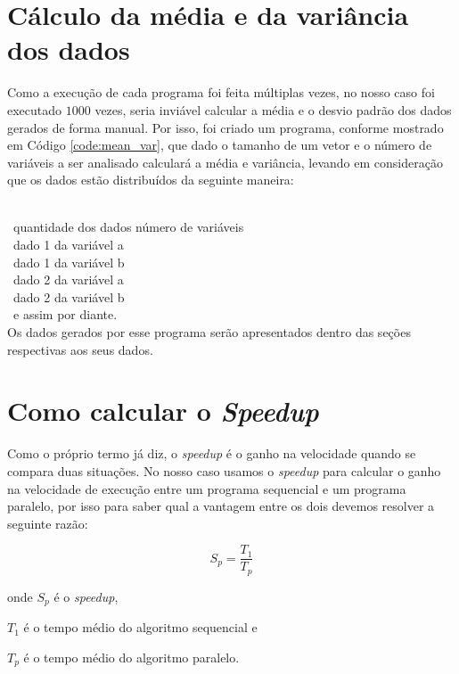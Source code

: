 \documentclass[11pt,twoside]{article}
\begin{document}
\section{Cálculo da média e da variância dos dados}
\label{sec:mean_var}

    Como a execução de cada programa foi feita múltiplas vezes, no nosso caso foi executado
    $1000$ vezes, seria inviável calcular a média e o desvio padrão dos dados gerados de forma
    manual. Por isso, foi criado um programa, conforme mostrado em Código \ref{code:mean_var},
    que dado o tamanho de um vetor e o número de variáveis a ser analisado calculará a média
    e variância, levando em consideração que os dados estão distribuídos da seguinte maneira:
    
    \ \\
    \ \indent quantidade dos dados \indent número de variáveis\\
    \ \indent dado 1 da variável a\\
    \ \indent dado 1 da variável b\\
    \ \indent dado 2 da variável a\\
    \ \indent dado 2 da variável b\\
    \ \indent e assim por diante.
    \ \\
    
    Os dados gerados por esse programa serão apresentados dentro das seções respectivas aos
    seus dados.

\section{Como calcular o {\it Speedup }}
\label{sec:speedup}

    Como o próprio termo já diz, o {\it speedup} é o ganho na velocidade quando se compara duas
    situações. No nosso caso usamos o {\it speedup} para calcular o ganho na velocidade de
    execução entre um programa sequencial e um programa paralelo, por isso para saber qual
    a vantagem entre os dois devemos resolver a seguinte razão:
    
    \begin{equation}
        S_p = \frac{T_1}{T_p}
    \end{equation}

    onde $S_p$ é o {\it speedup},
    
    $T_1$ é o tempo médio do algoritmo sequencial e
    
    $T_p$ é o tempo médio do algoritmo paralelo.\\
    
\end{document}
